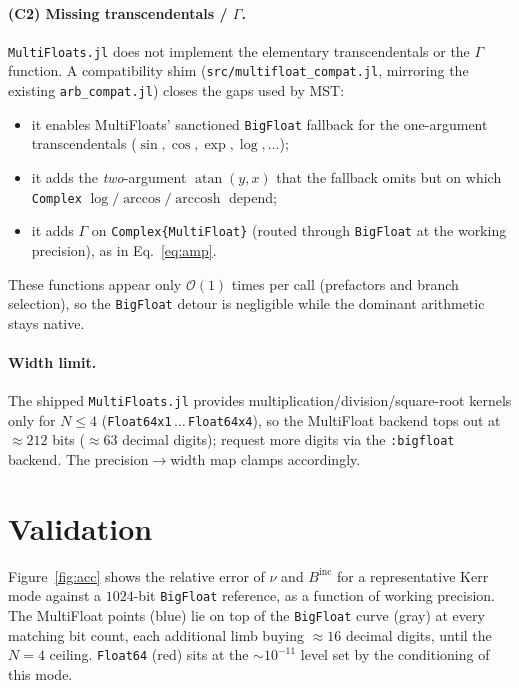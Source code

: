 \documentclass[11pt]{article}
\newcommand{\Binc}{B^{\mathrm{inc}}}
\newcommand{\bigO}{\mathcal{O}}
\begin{document}
\paragraph{(C2) Missing transcendentals / $\Gamma$.}
\texttt{MultiFloats.jl} does not implement the elementary transcendentals or the
$\Gamma$ function. A compatibility shim (\texttt{src/multifloat\_compat.jl},
mirroring the existing \texttt{arb\_compat.jl}) closes the gaps used by MST:
\begin{itemize}
  \item it enables MultiFloats' sanctioned \texttt{BigFloat} fallback for the
        one-argument transcendentals ($\sin,\cos,\exp,\log,\dots$);
  \item it adds the \emph{two}-argument $\operatorname{atan}(y,x)$ that the
        fallback omits but on which \texttt{Complex} $\log/\arccos/\operatorname{arccosh}$
        depend;
  \item it adds $\Gamma$ on \texttt{Complex\{MultiFloat\}} (routed through
        \texttt{BigFloat} at the working precision), as in
        Eq.~\eqref{eq:amp}.
\end{itemize}
These functions appear only $\bigO(1)$ times per call (prefactors and branch
selection), so the \texttt{BigFloat} detour is negligible while the dominant
arithmetic stays native.

\paragraph{Width limit.} The shipped \texttt{MultiFloats.jl} provides
multiplication/division/square-root kernels only for $N\le 4$
(\texttt{Float64x1}\,$\ldots$\,\texttt{Float64x4}), so the MultiFloat backend tops
out at $\approx 212$ bits ($\approx 63$ decimal digits); request more digits via
the \texttt{:bigfloat} backend. The precision$\to$width map clamps accordingly.

\section{Validation}

Figure~\ref{fig:acc} shows the relative error of $\nu$ and $\Binc$ for a
representative Kerr mode against a $1024$-bit \texttt{BigFloat} reference, as a
function of working precision. The MultiFloat points (blue) lie on top of the
\texttt{BigFloat} curve (gray) at every matching bit count, each additional limb
buying $\approx 16$ decimal digits, until the $N=4$ ceiling. \texttt{Float64}
(red) sits at the $\sim 10^{-11}$ level set by the conditioning of this mode.
\end{document}

